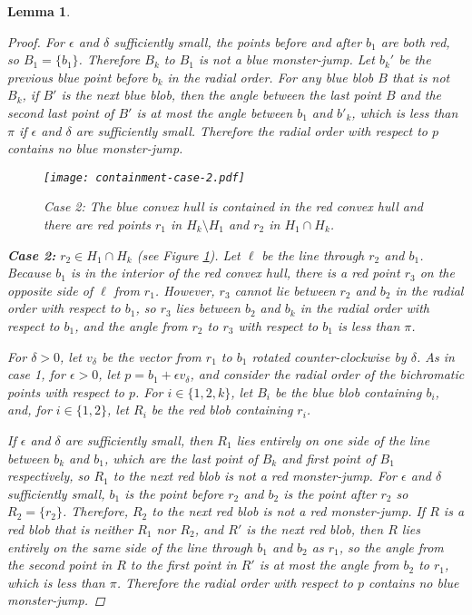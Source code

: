 \documentclass[12pt]{article}
\newtheorem{lemma}{Lemma}
\theoremstyle{definition}
\begin{document}
\begin{lemma}
\begin{proof}
    For $\epsilon$ and $\delta$ sufficiently small, the points before and after $b_1$ are both red, so $B_1=\{b_1\}$.
    Therefore $B_k$ to $B_1$ is not a blue monster-jump.
    Let $b_k'$ be the previous blue point before $b_k$ in the radial order.
    For any blue blob $B$ that is not $B_k$, if $B'$ is the next blue blob, then the angle between the last point $B$ and the second last point of $B'$ is at most the angle between $b_1$ and $b'_k$, which is less than $\pi$ if $\epsilon$ and $\delta$ are sufficiently small.
    Therefore the radial order with respect to $p$ contains no blue monster-jump.

\begin{figure}
\centering
\texttt{[image: containment-case-2.pdf]}
\caption{Case 2: The blue convex hull is contained in the red convex hull and
there are red points $r_1$ in $H_k\setminus H_1$ and $r_2$ in $H_1\cap H_k$.}
\label{fig:containment-case-2}
\end{figure}


    \textbf{Case 2:} $r_2\in H_1\cap H_k$ (see Figure \ref{fig:containment-case-2}).
    Let $\ell$ be the line through $r_2$ and $b_1$.
    Because $b_1$ is in the interior of the red convex hull, there is a red point $r_3$ on the opposite side of $\ell$ from $r_1$.
    However, $r_3$ cannot lie between $r_2$ and $b_2$ in the radial order with respect to $b_1$, so $r_3$ lies between $b_2$ and $b_k$ in the radial order with respect to $b_1$, and the angle from $r_2$ to $r_3$ with respect to $b_1$ is less than $\pi$.
    
    For $\delta>0$, let $v_\delta$ be the vector from $r_1$ to $b_1$ rotated counter-clockwise by $\delta$.
    As in case 1, for $\epsilon>0$, let $p=b_1+\epsilon v_\delta$, and consider the radial order of the bichromatic points with respect to $p$.
    For $i\in\{1,2,k\}$, let $B_i$ be the blue blob containing $b_i$, and, for $i\in\{1,2\}$, let $R_i$ be the red blob containing $r_i$.

    If $\epsilon$ and $\delta$ are sufficiently small, then $R_1$ lies entirely on one side of the line between $b_k$ and $b_1$, which are the last point of $B_k$ and first point of $B_1$ respectively, so $R_1$ to the next red blob is not a red monster-jump.
    For $\epsilon$ and $\delta$ sufficiently small, $b_1$ is the point before $r_2$ and $b_2$ is the point after $r_2$ so $R_2=\{r_2\}$. Therefore, $R_2$ to the next red blob is not a red monster-jump.
    If $R$ is a red blob that is neither $R_1$ nor $R_2$, and $R'$ is the next red blob, then $R$ lies entirely on the same side of the line through $b_1$ and $b_2$ as $r_1$, so the angle from the second point in $R$ to the first point in $R'$ is at most the angle from $b_2$ to $r_1$, which is less than $\pi$.
    Therefore the radial order with respect to $p$ contains no blue monster-jump.


\end{proof}
\end{lemma}
\end{document}
